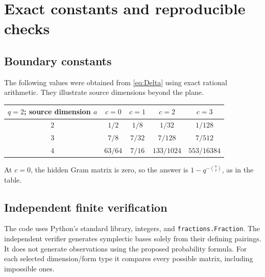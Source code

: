 \section{Exact constants and reproducible checks}\label{sec:checks}

\subsection{Boundary constants}

The following values were obtained from \eqref{eq:Delta} using exact
rational arithmetic. They illustrate source dimensions beyond the plane.
\begin{center}
\begin{tabular}{ccccc}
\toprule
$q=2$; source dimension $a$ & $c=0$ & $c=1$ & $c=2$ & $c=3$\\
\midrule
$2$ & $1/2$ & $1/8$ & $1/32$ & $1/128$\\
$3$ & $7/8$ & $7/32$ & $7/128$ & $7/512$\\
$4$ & $63/64$ & $7/16$ & $133/1024$ & $553/16384$\\
\bottomrule
\end{tabular}
\end{center}
At $c=0$, the hidden Gram matrix is zero, so the answer is
$1-q^{-\binom a2}$, as in the table.

\subsection{Independent finite verification}

The code uses Python's standard library, integers, and
\texttt{fractions.Fraction}. The independent verifier generates
symplectic bases solely from their defining pairings. It does not
generate observations using the proposed probability formula.
For each selected dimension/form type it compares every possible
matrix, including impossible ones.

